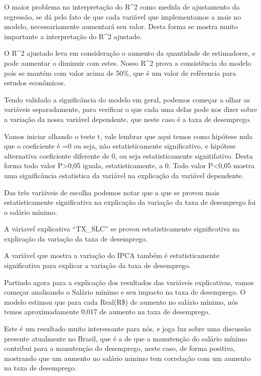\documentclass[
]{article}
\begin{document}
O maior problema na interpretação do R\^{}2 como medida de ajustamento
da regressão, se dá pelo fato de que cada variável que implementamos a
mais no modelo, necessariamente aumentará seu valor. Desta forma se
mostra muito importante a interpretação do R\^{}2 ajustado.

O R\^{}2 ajustado leva em consideração o aumento da quantidade de
estimadores, e pode aumentar o diminuir com estes. Nosso R\^{}2 prova a
consistência do modelo pois se mantém com valor acima de 50\%, que é um
valor de refêrencia para estudos econômicos.

Tendo validado a significância do modelo em geral, podemos começar a
olhar as variáveis separadamente, para verificar o que cada uma delas
pode nos dizer sobre a variação da nossa variável dependente, que neste
caso é a taxa de desemprego.

Vamos iniciar olhando o teste t, vale lembrar que aqui temos como
hipótese nula que o coeficiente é =0 ou seja, não estatisticamente
significativo, e hipótese alternativa coeficiente diferente de 0, ou
seja estatisticamente signitifativo. Desta forma todo valor
P\textgreater0,05 iguala, estatisticamente, a 0. Todo valor
P\textless0,05 mostra uma significância estatistica da variável na
explicação da variável dependente.

Das três variáveis de escolha podemos notar que a que se provou mais
estatisticamente significativa na explicação da variação da taxa de
desemprego foi o salário mínimo.

A váriavel explicativa ``TX\_SLC'' se provou estatisticamente
significativa na explicação da variação da taxa de desemprego.

A variável que mostra a variação do IPCA também é estatisticamente
significativa para explicar a variação da taxa de desemprego.

Partindo agora para a explicação dos resultados das variáveis
explicativas, vamos começar analisando o Salário mínimo e seu impacto na
taxa de desemprego. O modelo estimou que para cada Real(R\$) de aumento
no salário mínimo, nós temos aproximadamente 0,017 de aumento na taxa de
desemprego.

Este é um resultado muito interessante para nós, e joga luz sobre uma
discussão presente atualmente no Brasil, que é a de que a manutenção do
salário mínimo contribui para a manutenção do desemprego, neste caso, de
forma positiva, mostrando que um aumento no salário minimo tem
correlação com um aumento na taxa de desemprego.
\end{document}
